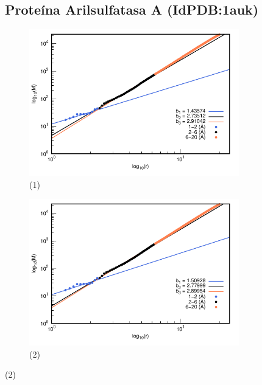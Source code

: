\begin{figure}[H]
	\subsection*{Proteína Arilsulfatasa A (IdPDB:1auk)}
	\hspace{-0.3cm} 
	\begin{subfigure}{0.49\textwidth}
		\centering
		\includegraphics[width=\linewidth,page=1]{graphs/PDBs/1auk/1aukaddH.pdf}
		\caption{(1)}
	\end{subfigure}
	\hspace{0.2cm}
	\begin{subfigure}{0.49\textwidth}
		\centering
		\includegraphics[width=\linewidth,page=1]{graphs/PDBs/1auk/1aukEm.pdf}
		\caption{(2)}
	\end{subfigure}
	

\end{figure}
